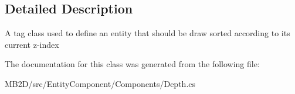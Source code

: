 \subsection{Detailed Description}
A tag class used to define an entity that should be draw sorted according to its current z-\/index 



The documentation for this class was generated from the following file\+:\begin{DoxyCompactItemize}
\item 
M\+B2\+D/src/\+Entity\+Component/\+Components/Depth.\+cs\end{DoxyCompactItemize}
